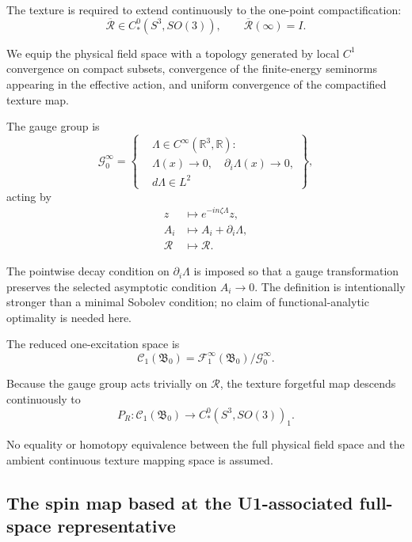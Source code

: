 \documentclass[11pt]{article}
\begin{document}
The texture is required to extend continuously to the one-point compactification:
\begin{equation}
\overline{\mathcal R}
\in
C_*^0(S^3,SO(3)),
\qquad
\overline{\mathcal R}(\infty)=I.
\end{equation}

We equip the physical field space with a topology generated by local \(C^1\) convergence on compact subsets, convergence of the finite-energy seminorms appearing in the effective action, and uniform convergence of the compactified texture map.

The gauge group is
\begin{equation}
\mathcal G_0^\infty
=
\left\{
\begin{aligned}
&\Lambda\in C^\infty(\mathbb R^3,\mathbb R):
\\[-1mm]
&\Lambda(x)\to0,
\quad\partial_i\Lambda(x)\to0,
\\[-1mm]
&d\Lambda\in L^2
\end{aligned}
\right\},
\end{equation}
acting by
\begin{align}
z&\mapsto e^{-in\zeta\Lambda}z,\\
A_i&\mapsto A_i+\partial_i\Lambda,\\
\mathcal R&\mapsto\mathcal R.
\end{align}

The pointwise decay condition on \(\partial_i\Lambda\) is imposed so that a gauge transformation preserves the selected asymptotic condition \(A_i\to0\). The definition is intentionally stronger than a minimal Sobolev condition; no claim of functional-analytic optimality is needed here.

The reduced one-excitation space is
\begin{equation}
\boxed{
\mathscr C_1(\mathfrak B_0)
=
\mathscr F_1^\infty(\mathfrak B_0)
/\mathcal G_0^\infty.
}
\end{equation}

Because the gauge group acts trivially on \(\mathcal R\), the texture forgetful map descends continuously to
\begin{equation}
\boxed{
P_R:
\mathscr C_1(\mathfrak B_0)
\longrightarrow
C_*^0(S^3,SO(3))_1.
}
\end{equation}

No equality or homotopy equivalence between the full physical field space and the ambient continuous texture mapping space is assumed.

\subsection{The spin map based at the U1-associated full-space representative}
\end{document}
